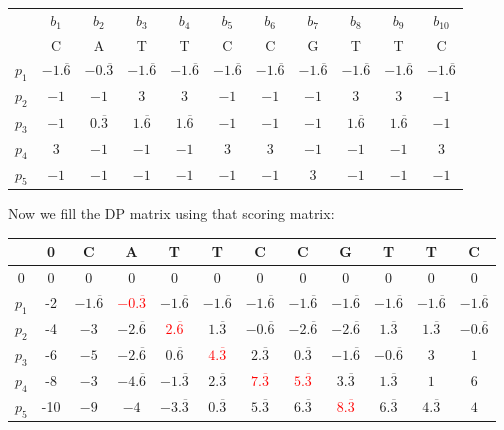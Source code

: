\documentclass[%
   10pt,              %
   nenglish,           %
   a4paper,           %
   DIV11,             %
]{scrartcl}%
\begin{document}
\begin{table}[h]
\centering
\begin{tabular}{c|cccccccccc}
   & $b_1$ & $b_2$ & $b_3$ & $b_4$ & $b_5$ & $b_6$ & $b_7$ & $b_8$ & $b_9$ & $b_{10}$ \\
   & C & A & T & T & C & C & G & T & T & C \\
 \hline
 $p_1$ & $-1.\overline{6}$ & $-0.\overline{3}$ & $-1.\overline{6}$ & $-1.\overline{6}$ & $-1.\overline{6}$ & $-1.\overline{6}$ & $-1.\overline{6}$ & $-1.\overline{6}$ & $-1.\overline{6}$ & $-1.\overline{6}$ \\
 $p_2$ & $-1$ & $-1$ & $3$ & $3$ & $-1$ & $-1$ & $-1$ & $3$ & $3$ & $-1$ \\
 $p_3$ & $-1$ & $0.\overline{3}$ & $1.\overline{6}$ & $1.\overline{6}$ & $-1$ & $-1$ & $-1$ & $1.\overline{6}$ & $1.\overline{6}$ & $-1$ \\
 $p_4$ & $3$ & $-1$ & $-1$ & $-1$ & $3$ & $3$ & $-1$ & $-1$ & $-1$ & $3$ \\
 $p_5$ & $-1$ & $-1$ & $-1$ & $-1$ & $-1$ & $-1$ & $3$ & $-1$ & $-1$ & $-1$ 
\end{tabular}
\end{table}
\newpage
\noindent Now we fill the DP matrix using that scoring matrix:
\bigskip
\begin{table}[h!]
 \centering
 \begin{tabular}{c|ccccccccccc}
    & 0 & C & A & T & T & C & C & G & T & T & C \\
  \hline
  0 & 0 & 0 & 0 & 0 & 0 & 0 & 0 & 0 & 0 & 0 & 0 \\
  $p_1$ & -2 & $-1.\overline{6}$ & \textcolor{red}{$-0.\overline{3}$} & $-1.\overline{6}$ & $-1.\overline{6}$ & $-1.\overline{6}$ & $-1.\overline{6}$ & $-1.\overline{6}$ & $-1.\overline{6}$ & $-1.\overline{6}$ & $-1.\overline{6}$ \\
  $p_2$ & -4 & $-3$ & $-2.\overline{6}$ & \textcolor{red}{$2.\overline{6}$} & $1.\overline{3}$ & $-0.\overline{6}$ & $-2.\overline{6}$ & $-2.\overline{6}$ & $1.\overline{3}$ & $1.\overline{3}$ & $-0.\overline{6}$ \\
  $p_3$ & -6 & $-5$ & $-2.\overline{6}$ & $0.\overline{6}$ & \textcolor{red}{$4.\overline{3}$} & $2.\overline{3}$ & $0.\overline{3}$ & $-1.\overline{6}$ & $-0.\overline{6}$ & $3$ & $1$ \\
  $p_4$ & -8 & $-3$ & $-4.\overline{6}$ & $-1.\overline{3}$ & $2.\overline{3}$ & \textcolor{red}{$7.\overline{3}$} & \textcolor{red}{$5.\overline{3}$} & $3.\overline{3}$ & $1.\overline{3}$ & $1$ & $6$ \\
  $p_5$ & -10 & $-9$ & $-4$ & $-3.\overline{3}$ & $0.\overline{3}$ & $5.\overline{3}$ & $6.\overline{3}$ & \textcolor{red}{$8.\overline{3}$} & $6.\overline{3}$ & $4.\overline{3}$ &  $4$ \\
 \end{tabular} 
\end{table}
\end{document}
